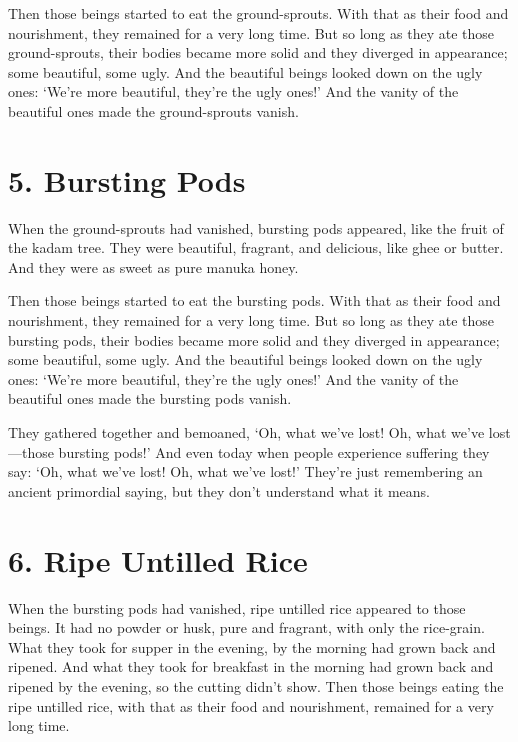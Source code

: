 \documentclass[12pt,openany]{book}%
\begin{document}
Then those beings started to eat the ground-sprouts. With that as their food and nourishment, they remained for a very long time. But so long as they ate those ground-sprouts, their bodies became more solid and they diverged in appearance; some beautiful, some ugly. And the beautiful beings looked down on the ugly ones: ‘We’re more beautiful, they’re the ugly ones!’ And the vanity of the beautiful ones made the ground-sprouts vanish. 

\section*{5. Bursting Pods }

When the ground-sprouts had vanished, bursting pods appeared, like the fruit of the kadam tree. They were beautiful, fragrant, and delicious, like ghee or butter. And they were as sweet as pure manuka honey. 

Then those beings started to eat the bursting pods. With that as their food and nourishment, they remained for a very long time. But so long as they ate those bursting pods, their bodies became more solid and they diverged in appearance; some beautiful, some ugly. And the beautiful beings looked down on the ugly ones: ‘We’re more beautiful, they’re the ugly ones!’ And the vanity of the beautiful ones made the bursting pods vanish. 

They gathered together and bemoaned, ‘Oh, what we’ve lost! Oh, what we’ve lost—those bursting pods!’ And even today when people experience suffering they say: ‘Oh, what we’ve lost! Oh, what we’ve lost!’ They’re just remembering an ancient primordial saying, but they don’t understand what it means. 

\section*{6. Ripe Untilled Rice }

When the bursting pods had vanished, ripe untilled rice appeared to those beings. It had no powder or husk, pure and fragrant, with only the rice-grain. What they took for supper in the evening, by the morning had grown back and ripened. And what they took for breakfast in the morning had grown back and ripened by the evening, so the cutting didn’t show. Then those beings eating the ripe untilled rice, with that as their food and nourishment, remained for a very long time. 
\end{document}
